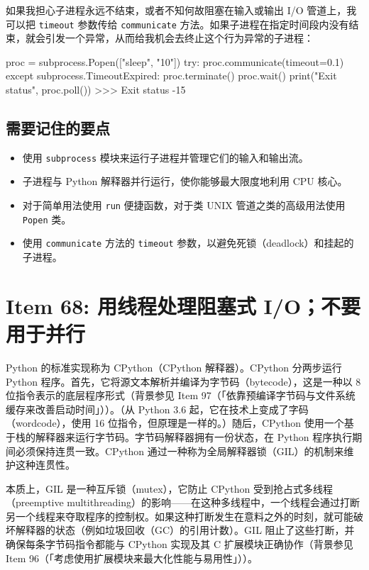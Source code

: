 如果我担心子进程永远不结束，或者不知何故阻塞在输入或输出 I/O 管道上，我可以把 \texttt{timeout} 参数传给 \texttt{communicate} 方法。如果子进程在指定时间段内没有结束，就会引发一个异常，从而给我机会去终止这个行为异常的子进程：

\begin{codebox}[python]
proc = subprocess.Popen(["sleep", "10"])
try:
    proc.communicate(timeout=0.1)
except subprocess.TimeoutExpired:
    proc.terminate()
    proc.wait()
print("Exit status", proc.poll())
>>>
Exit status -15
\end{codebox}

\subsection{需要记住的要点}

\begin{itemize}
\item 使用 \texttt{subprocess} 模块来运行子进程并管理它们的输入和输出流。
\item 子进程与 Python 解释器并行运行，使你能够最大限度地利用 CPU 核心。
\item 对于简单用法使用 \texttt{run} 便捷函数，对于类 UNIX 管道之类的高级用法使用 \texttt{Popen} 类。
\item 使用 \texttt{communicate} 方法的 \texttt{timeout} 参数，以避免死锁（deadlock）和挂起的子进程。
\end{itemize}

\section{Item 68: 用线程处理阻塞式 I/O；不要用于并行}

Python 的标准实现称为 CPython（CPython 解释器）。CPython 分两步运行 Python 程序。首先，它将源文本解析并编译为字节码（bytecode），这是一种以 8 位指令表示的底层程序形式（背景参见 Item 97（「依靠预编译字节码与文件系统缓存来改善启动时间」））。（从 Python 3.6 起，它在技术上变成了字码（wordcode），使用 16 位指令，但原理是一样的。）随后，CPython 使用一个基于栈的解释器来运行字节码。字节码解释器拥有一份状态，在 Python 程序执行期间必须保持连贯一致。CPython 通过一种称为全局解释器锁（GIL）的机制来维护这种连贯性。

本质上，GIL 是一种互斥锁（mutex），它防止 CPython 受到抢占式多线程（preemptive multithreading）的影响——在这种多线程中，一个线程会通过打断另一个线程来夺取程序的控制权。如果这种打断发生在意料之外的时刻，就可能破坏解释器的状态（例如垃圾回收（GC）的引用计数）。GIL 阻止了这些打断，并确保每条字节码指令都能与 CPython 实现及其 C 扩展模块正确协作（背景参见 Item 96（「考虑使用扩展模块来最大化性能与易用性」））。

